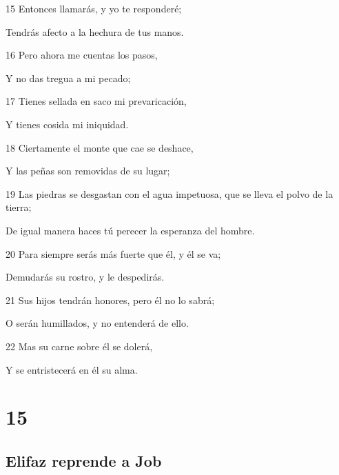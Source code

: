 \par 15 Entonces llamarás, y yo te responderé;
\par Tendrás afecto a la hechura de tus manos.
\par 16 Pero ahora me cuentas los pasos,
\par Y no das tregua a mi pecado;
\par 17 Tienes sellada en saco mi prevaricación,
\par Y tienes cosida mi iniquidad.
\par 18 Ciertamente el monte que cae se deshace,
\par Y las peñas son removidas de su lugar;
\par 19 Las piedras se desgastan con el agua impetuosa, que se lleva el polvo de la tierra;
\par De igual manera haces tú perecer la esperanza del hombre.
\par 20 Para siempre serás más fuerte que él, y él se va;
\par Demudarás su rostro, y le despedirás. 
\par 21 Sus hijos tendrán honores, pero él no lo sabrá;
\par O serán humillados, y no entenderá de ello.
\par 22 Mas su carne sobre él se dolerá,
\par Y se entristecerá en él su alma. 

\chapter{15}

\section*{Elifaz reprende a Job}

